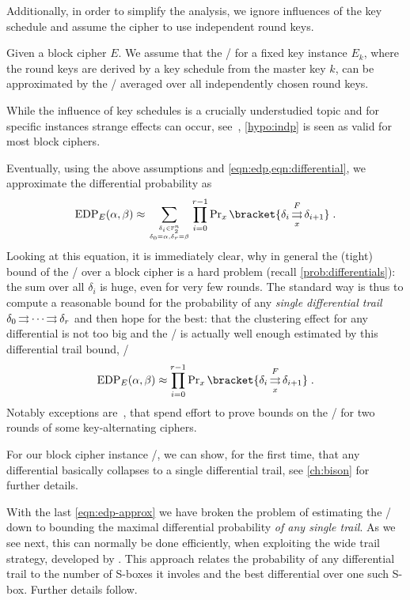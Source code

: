 Additionally, in order to simplify the analysis, we ignore influences of the key schedule and assume the cipher to use independent round keys.
\begin{hypothesis}\label{hypo:indp}
    Given a block cipher $E$.
    We assume that the \EDP/ for a fixed key instance $E_k$, where the round keys are derived by a key schedule from the master key $k$, can be approximated by the \EDP/ averaged over all independently chosen round keys.
\end{hypothesis}
While the influence of key schedules is a crucially understudied topic and for specific instances strange effects can occur, see~\cite{C:AABL12,ToSC:KraLeaWie17}, \cref{hypo:indp} is seen as valid for most block ciphers.

Eventually, using the above assumptions and \cref{eqn:edp,eqn:differential}, we approximate the differential probability as
\begin{equation*}
    \mathrm{EDP}_E(\alpha, \beta)
    \approx \sum_{\tower{\delta_i \in \F_2^n}{\delta_0 = \alpha, \delta_r = \beta}}
      \prod_{i=0}^{r-1} \Prob_x\bracket{\propDiff{\delta_i}{F}{x}{\delta_{i+1}}}\;.
\end{equation*}
Looking at this equation, it is immediately clear, why in general the (tight) bound of the \MEDP/ over a block cipher is a hard problem (recall \cref{prob:differentials}): the sum over all $\delta_i$ is huge, even for very few rounds.
The standard way is thus to compute a reasonable bound for the probability of any \emph{single differential trail} $\delta_0 \operatorname*{\rightrightarrows}^{}_{} \cdots \operatorname*{\rightrightarrows}^{}_{} \delta_{r}$ and then hope for the best: that the clustering effect for any differential is not too big and the \EDP/ is actually well enough estimated by this differential trail bound, \ie/
\begin{equation}\label{eqn:edp-approx}
    \mathrm{EDP}_E(\alpha, \beta)
    \approx \prod_{i=0}^{r-1} \Prob_x\bracket{\propDiff{\delta_i}{F}{x}{\delta_{i+1}}}\;.
\end{equation}
Notably exceptions are~, that spend effort to prove bounds on the \MEDP/ for two rounds of some key-alternating ciphers.

For our block cipher instance \bison/, we can show, for the first time, that any differential basically collapses to a single differential trail, see \cref{ch:bison} for further details.

With the last \cref{eqn:edp-approx} we have broken the problem of estimating the \MEDP/ down to bounding the maximal differential probability \emph{of any single trail}.
As we see next, this can normally be done efficiently, when exploiting the wide trail strategy, developed by \textcite{PhD:Daemen95}.
This approach relates the probability of any differential trail to the number of S-boxes it involes and the best differential over one such S-box.
Further details follow.

